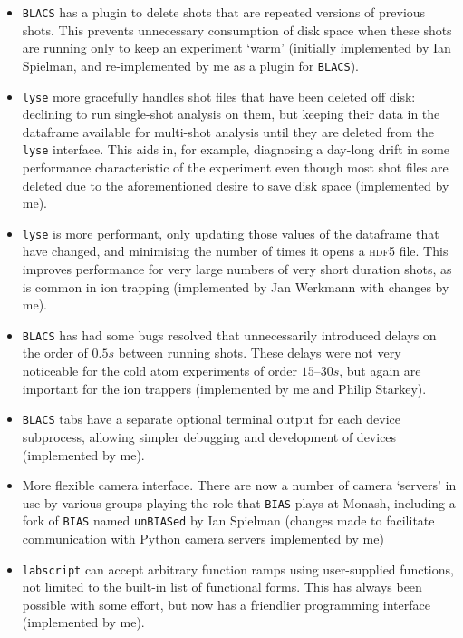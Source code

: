 \begin{itemize}
    \item \texttt{BLACS} has a plugin to delete shots that are repeated versions of previous shots. This prevents unnecessary consumption of disk space when these shots are running only to keep an experiment `warm' (initially implemented by Ian Spielman, and re-implemented by me as a plugin for \texttt{BLACS}).
    
    \item \texttt{lyse} more gracefully handles shot files that have been deleted off disk: declining to run single-shot analysis on them, but keeping their data in the dataframe available for multi-shot analysis until they are deleted from the \texttt{lyse} interface. This aids in, for example, diagnosing a day-long drift in some performance characteristic of the experiment even though most shot files are deleted due to the aforementioned desire to save disk space (implemented by me).
    
    \item \texttt{lyse} is more performant, only updating those values of the dataframe that have changed, and minimising the number of times it opens a \textsc{hdf5} file. This improves performance for very large numbers of very short duration shots, as is common in ion trapping (implemented by Jan Werkmann with changes by me).
    
    \item \texttt{BLACS} has had some bugs resolved that unnecessarily introduced delays on the order of $0.5\unit{s}$ between running shots. These delays were not very noticeable for the cold atom experiments of order $15\textrm{--}30\unit{s}$, but again are important for the ion trappers (implemented by me and Philip Starkey).
    
    \item \texttt{BLACS} tabs have a separate optional terminal output for each device subprocess, allowing simpler debugging and development of devices (implemented by me).
    
    \item More flexible camera interface. There are now a number of camera `servers' in use by various groups playing the role that \texttt{BIAS} plays at Monash, including a fork of \texttt{BIAS} named \texttt{unBIASed} by Ian Spielman (changes made to facilitate communication with Python camera servers implemented by me)
    
    \item \texttt{labscript} can accept arbitrary function ramps using user-supplied functions, not limited to the built-in list of functional forms. This has always been possible with some effort, but now has a friendlier programming interface (implemented by me).
    

\end{itemize}
